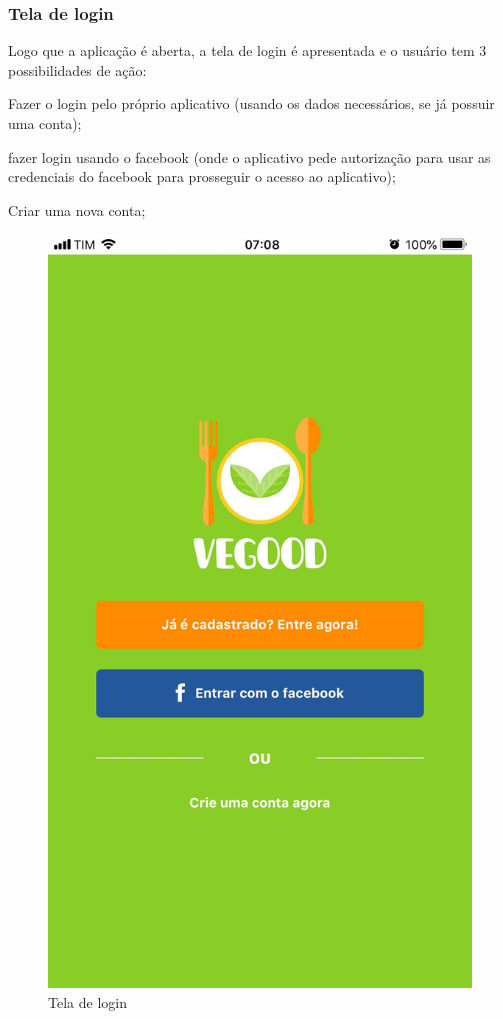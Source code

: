 \subsubsection{Tela de login}
Logo que a aplicação é aberta, a tela de login é apresentada e o usuário tem 3 possibilidades de ação: 
\begin{lista}
	\item Fazer o login pelo próprio aplicativo (usando os dados necessários, se já possuir uma conta);
	\item fazer login usando o facebook (onde o aplicativo pede autorização para usar as credenciais do facebook para prosseguir o acesso ao aplicativo);
	\item  Criar uma nova conta;
\end{lista}

\begin{figure}[H]
	\caption{\label{fig:tela-de-login}Tela de login}
	\centering
	\includegraphics[scale=0.15]{imagens/figura11.jpg}
\end{figure}




